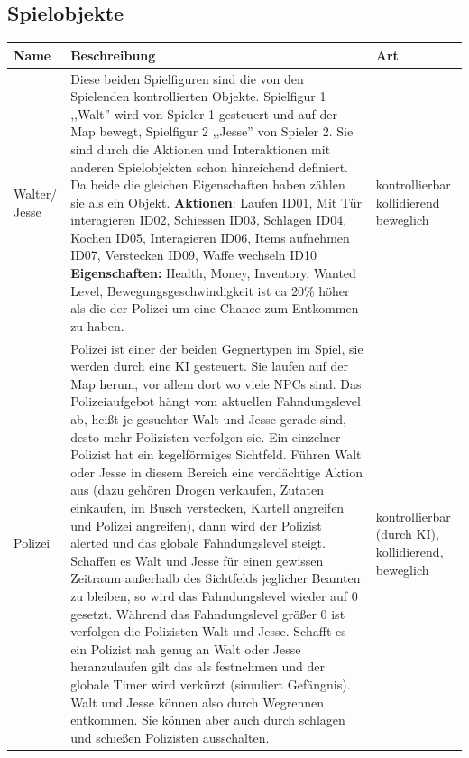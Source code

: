 \subsection{Spielobjekte}\label{subsec:spielobjekte}

\begin{tabular}{|m{1.5cm}|m{13cm}|m{2.5cm}|}
    \hline
    \textbf{Name} & \textbf{Beschreibung} & \textbf{Art} \\
    \hline
    Walter/ \newline Jesse &
    Diese beiden Spielfiguren sind die von den Spielenden kontrollierten Objekte.
    Spielfigur 1 ,,Walt'' wird von Spieler 1 gesteuert und auf der Map bewegt, Spielfigur 2 ,,Jesse'' von Spieler 2. Sie sind durch die Aktionen und Interaktionen mit anderen Spielobjekten schon hinreichend definiert. Da beide die gleichen Eigenschaften haben zählen sie als ein Objekt.\newline
    \textbf{Aktionen}: Laufen ID01, Mit Tür interagieren ID02, Schiessen ID03, Schlagen ID04, Kochen ID05, Interagieren ID06, Items aufnehmen ID07, Verstecken ID09, Waffe wechseln ID10 \newline
    \textbf{Eigenschaften:} Health, Money, Inventory, Wanted Level, Bewegungsgeschwindigkeit ist ca 20\% höher als die der Polizei um eine Chance zum Entkommen zu haben.

    & kontrollierbar \newline
    kollidierend \newline
    beweglich \\

    \hline
    Polizei &
    Polizei ist einer der beiden Gegnertypen im Spiel, sie werden durch eine KI gesteuert.
    Sie laufen auf der Map herum, vor allem dort wo viele NPCs sind.
    Das Polizeiaufgebot hängt vom aktuellen Fahndungslevel ab, heißt je gesuchter Walt und Jesse gerade sind, desto mehr Polizisten verfolgen sie.
    Ein einzelner Polizist hat ein kegelförmiges Sichtfeld.
    Führen Walt oder Jesse in diesem Bereich eine verdächtige Aktion aus (dazu gehören Drogen verkaufen, Zutaten einkaufen, im Busch verstecken, Kartell angreifen und Polizei angreifen), dann wird der Polizist alerted und das globale Fahndungslevel steigt.
    Schaffen es Walt und Jesse für einen gewissen Zeitraum außerhalb des Sichtfelds jeglicher Beamten zu bleiben, so wird das Fahndungslevel wieder auf 0 gesetzt.
    Während das Fahndungslevel größer 0 ist verfolgen die Polizisten Walt und Jesse.
    Schafft es ein Polizist nah genug an Walt oder Jesse heranzulaufen gilt das als festnehmen und der globale Timer wird verkürzt (simuliert Gefängnis).
    Walt und Jesse können also durch Wegrennen entkommen.
    Sie können aber auch durch schlagen und schießen Polizisten ausschalten. &
    kontrollierbar (durch KI), kollidierend, beweglich\\
    \hline


\end{tabular}
